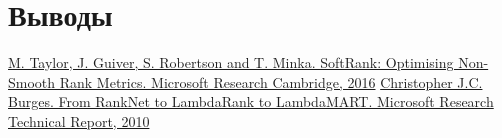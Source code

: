 \documentclass[14pt,a4paper]{amsart}
\theoremstyle{definition}
\theoremstyle{definition}
\begin{document}

\newpage
\section{Выводы}


\newpage

\begin{thebibliography}{1}

 \href{https://www.microsoft.com/en-us/research/publication/softrank-optimising-non-smooth-rank-metrics/}
{M. Taylor, J. Guiver, S. Robertson and T. Minka. SoftRank: Optimising Non-Smooth Rank Metrics. Microsoft Research Cambridge, 2016}
 \href{https://www.microsoft.com/en-us/research/publication/from-ranknet-to-lambdarank-to-lambdamart-an-overview/}
{Christopher J.C. Burges. From RankNet to LambdaRank to LambdaMART. Microsoft Research Technical Report, 2010}

\end{thebibliography}


\vspace{0.7cm}
\end{document}
